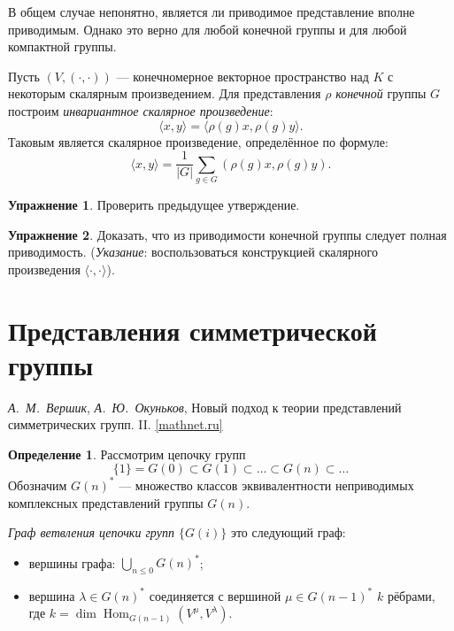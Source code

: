 \documentclass[12pt]{article}%
\renewcommand{\leq}{\leqslant}
\renewcommand{\leq}{\leqslant}
\DeclareMathOperator{\Hom}{Hom}
\newcommand{\rep}[1]{#1^*}
\theoremstyle{remark}
\theoremstyle{definition}
\newtheorem{Exec}{Упражнение}
\newtheorem{Def}{Определение}[section]
\begin{document}

В общем случае непонятно, является ли приводимое представление вполне
приводимым. Однако это верно для любой конечной группы и для любой компактной
группы.

Пусть $(V, (\cdot, \cdot))$ — конечномерное векторное пространство над $K$ с
некоторым скалярным произведением. Для представления $\rho$ \emph{конечной} группы $G$
построим \emph{инвариантное скалярное произведение}: 
\[
    \langle x, y\rangle = \langle \rho(g)x, \rho(g)y \rangle.
\]
Таковым является скалярное произведение, определённое по формуле:
\[
    \langle x, y\rangle = \frac {1} {|G|} \sum_{g\in G} (\rho(g)x, \rho(g)y).
\]
\begin{Exec}
Проверить предыдущее утверждение.
\end{Exec}

\begin{Exec}
Доказать, что из приводимости конечной группы следует полная приводимость.
(\emph{Указание}: воспользоваться конструкцией скалярного произведения $\langle
\cdot, \cdot\rangle$).
\end{Exec}

\section{Представления симметрической группы}
\begin{thebibliography}{9}
\emph{А.~М.~Вершик}, \emph{А.~Ю.~Окуньков},
Новый подход к теории представлений симметрических групп. II.
\href{http://www.mathnet.ru/php/archive.phtml?wshow=paper&jrnid=znsl&paperid=840&option_lang=rus}{[mathnet.ru]}
\end{thebibliography}

\begin{Def}
Рассмотрим цепочку групп
\[
    \{ 1 \} = G(0) \subset G(1) \subset \ldots \subset G(n) \subset \ldots
\]
Обозначим $\rep{G(n)}$ — множество классов эквивалентности неприводимых
комплексных представлений группы $G(n)$.

\emph{Граф ветвления цепочки групп $\{G(i)\}$} это следующий граф: 
\begin{itemize}
  \item вершины графа: $\bigcup_{n \leq 0} \rep{G(n)}$;
  \item вершина $\lambda \in \rep{G(n)}$ соединяется с вершиной $\mu \in
  \rep{G(n-1)}$ $k$ рёбрами,  где $k=\dim \Hom_{G(n-1)}(V^\mu, V^\lambda)$.
\end{itemize}
\end{Def}
\end{document}
